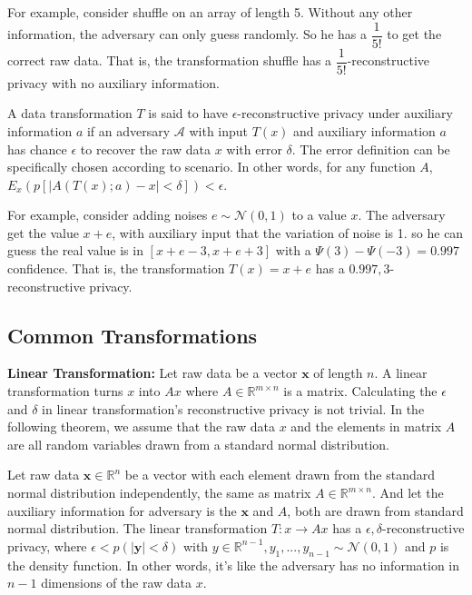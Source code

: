 For example, consider shuffle on an array of length 5. Without any other information, the adversary can only guess randomly. So he has a $\dfrac1{5!}$ to get the correct raw data. That is, the transformation shuffle has a $\dfrac1{5!}$-reconstructive privacy with no auxiliary information.

\begin{definition}
    A data transformation $T$ is said to have $\epsilon$-reconstructive privacy under auxiliary information $a$ if an adversary $\mathcal A$ with input $T(x)$ and auxiliary information $a$ has chance $\epsilon$ to recover the raw data $x$ with error $\delta$. The error definition can be specifically chosen according to scenario.
    In other words, for any function $A$, $E_x(p[|A(T(x); a) - x| < \delta]) < \epsilon$.
\end{definition}

For example, consider adding noises $e \sim \mathcal N(0,1)$ to a value $x$. The adversary get the value $x + e$, with auxiliary input that the variation of noise is 1. so he can guess the real value is in $[x + e -3, x + e + 3]$ with a $\Psi(3) - \Psi(-3) = 0.997$ confidence. That is, the transformation $T(x) = x + e$ has a $0.997,3$-reconstructive privacy.

\subsection{Common Transformations}
\textbf{Linear Transformation: }
Let raw data be a vector  $\mathbf x$ of length $n$. A linear transformation turns $x$ into $Ax$ where $A\in \mathbb R^{m\times n}$ is a matrix. Calculating the $\epsilon$ and $\delta$ in linear transformation's reconstructive privacy is not trivial. In the following theorem, we assume that the raw data $x$ and the elements in matrix $A$ are all random variables drawn from a standard normal distribution.

\begin{theorem}\label{thm:linear}
    Let raw data $\mathbf x \in \mathbb R^n$ be a vector with each element drawn from the standard normal distribution independently, the same as matrix $A \in \mathbb R^{m\times n}$. And let the auxiliary information for adversary is the $\mathbf x$ and $A$, both are drawn from standard normal distribution. The linear transformation $T: x\rightarrow Ax$ has a $\epsilon, \delta$-reconstructive privacy, where $\epsilon < p(|\mathbf y| <\delta)$ with $y\in \mathbb R^{n-1}, y_1,...,y_{n-1} \sim \mathcal N(0, 1)$ and $p$ is the density function. In other words, it's like the adversary has no information in $n - 1$ dimensions of the raw data $x$.
\end{theorem}

